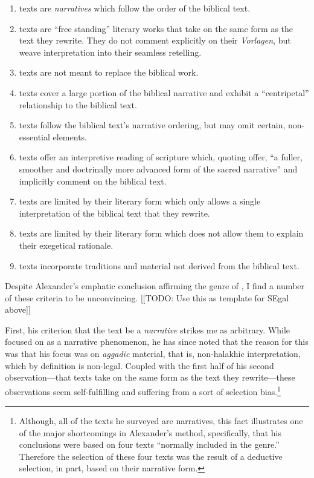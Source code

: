 \begin{enumerate}
    \item \rwb texts are \emph{narratives} which follow the order of the biblical text. 
    \item \rwb texts are ``free standing'' literary works that take on the same form as the text they rewrite. They do not comment explicitly on their \emph{Vorlagen}, but weave interpretation into their seamless retelling. 
    \item \rwb texts are not meant to replace the biblical work. 
    \item \rwb texts cover a large portion of the biblical narrative and exhibit a ``centripetal'' relationship to the biblical text. 
    \item \rwb texts follow the biblical text's narrative ordering, but may omit certain, non-essential elements. 
    \item \rwb texts offer an interpretive reading of scripture which, quoting \vermes offer, ``a fuller, smoother and doctrinally more advanced form of the sacred narrative''\autocite[Citing \vermes in][305]{schurer1986} and implicitly comment on the biblical text. 
    \item \rwb texts are limited by their literary form which only allows a single interpretation of the biblical text that they rewrite. 
    \item \rwb texts are limited by their literary form which does not allow them to explain their exegetical rationale. 
    \item \rwb texts incorporate traditions and material not derived from the biblical text.
\end{enumerate} 

Despite Alexander's emphatic conclusion affirming the genre of \RwB, I find a number of these criteria to be unconvincing. [[TODO: Use this as template for SEgal above]]

First, his criterion that the text be a \emph{narrative} strikes me as arbitrary. While \vermes focused on \rwb as a narrative phenomenon, he has since noted that the reason for this was that his focus was on \emph{aggadic} material, that is, non-halakhic interpretation, which by definition is non-legal. Coupled with the first half of his second observation---that \rwb texts take on the same form as the text they rewrite---these observations seem self-fulfilling and suffering from a sort of selection bias.\footnote{Although,   all of the texts he surveyed are narratives, this fact illustrates one   of the major shortcomings in Alexander's method, specifically, that   his conclusions were based on four texts ``normally included in the   genre.''\autocite[99]{alexander_carson-williamson1988} Therefore the   selection of these four texts was the result of a deductive selection,   in part, based on their narrative form.} 

